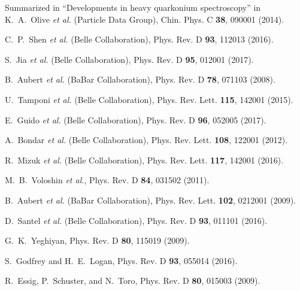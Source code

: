 \documentclass[12pt]{article}
\begin{document}
\begin{thebibliography}{99}

Summarized in ``Developments in heavy quarkonium spectroscopy'' in K.~A.~Olive \emph{et al.} (Particle Data Group), Chin. Phys. C {\bf 38}, 090001 (2014).

C.~P.~Shen \emph{et al.} (Belle Collaboration), Phys. Rev. D {\bf 93}, 112013 (2016).

S.~Jia \emph{et al.} (Belle Collaboration), Phys. Rev. D {\bf 95}, 012001 (2017).

B.~Aubert \emph{et al.} (BaBar Collaboration), Phys. Rev. D {\bf 78}, 071103 (2008).

U.~Tamponi \emph{et al.} (Belle Collaboration), Phys. Rev. Lett. {\bf 115}, 142001 (2015).

E.~Guido \emph{et al.} (Belle Collaboration), Phys. Rev. D {\bf 96}, 052005 (2017).

A.~Bondar \emph{et al.} (Belle Collaboration), Phys. Rev. Lett. {\bf 108}, 122001 (2012).

R.~Mizuk \emph{et al.} (Belle Collaboration), Phys. Rev. Lett. {\bf 117}, 142001 (2016).

M.~B.~Voloshin \emph{et al.}, Phys. Rev. D {\bf 84}, 031502 (2011).

B.~Aubert \emph{et al.} (BaBar Collaboration), Phys. Rev. Lett. {\bf 102}, 0212001 (2009).

D.~Santel \emph{et al.} (Belle Collaboration), Phys. Rev. D {\bf 93}, 011101 (2016).

G.~K.~Yeghiyan, Phys. Rev. D {\bf 80}, 115019 (2009).

S.~Godfrey and H.~E.~Logan, Phys. Rev. D {\bf 93}, 055014 (2016).

R.~Essig, P.~Schuster, and N.~Toro, Phys. Rev. D {\bf 80}, 015003 (2009).


\end{thebibliography}
 
\end{document}
